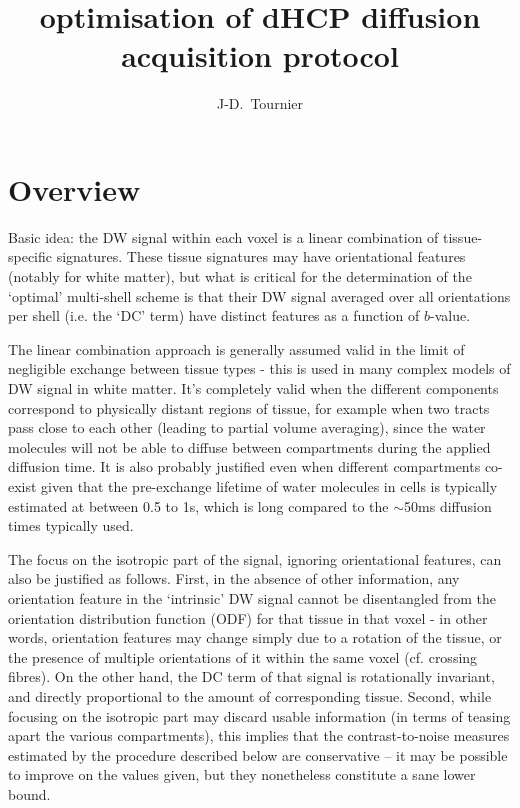 \documentclass{article}
\author{J-D.~Tournier}
\title{optimisation of dHCP diffusion acquisition protocol}
\begin{document}
\maketitle

\section{Overview}

Basic idea: the DW signal within each voxel is a linear combination of tissue-specific
signatures. These tissue signatures may have orientational features (notably
for white matter), but what is critical for the determination of the `optimal'
multi-shell scheme is that their DW signal averaged over all orientations per
shell (i.e.  the `DC' term) have distinct features as a function of $b$-value. 

The linear combination approach is generally assumed valid in the limit of
negligible exchange between tissue types - this is used in many complex models
of DW signal in white matter. It's completely valid when the different
components correspond to physically distant regions of tissue, for example when
two tracts pass close to each other (leading to partial volume averaging),
since the water molecules will not be able to diffuse between compartments
during the applied diffusion time. It is also probably justified even when different
compartments co-exist given that the pre-exchange lifetime of water molecules
in cells is typically estimated at between 0.5 to 1s, which is long compared to
the $\sim$50ms diffusion times typically used. 

The focus on the isotropic part of the signal, ignoring orientational features,
can also be justified as follows. First, in the absence of other information, any
orientation feature in the `intrinsic' DW signal cannot be disentangled from
the orientation distribution function (ODF) for that tissue in that voxel - in
other words, orientation features may change simply due to a rotation of the
tissue, or the presence of multiple orientations of it within the same voxel
(cf. crossing fibres). On the other hand, the DC term of that signal is
rotationally invariant, and directly proportional to the amount of
corresponding tissue. Second, while focusing on the isotropic part may discard
usable information (in terms of teasing apart the various compartments), this
implies that the contrast-to-noise measures estimated by the procedure
described below are conservative -- it may be possible to improve on the values
given, but they nonetheless constitute a sane lower bound. 
\end{document}
